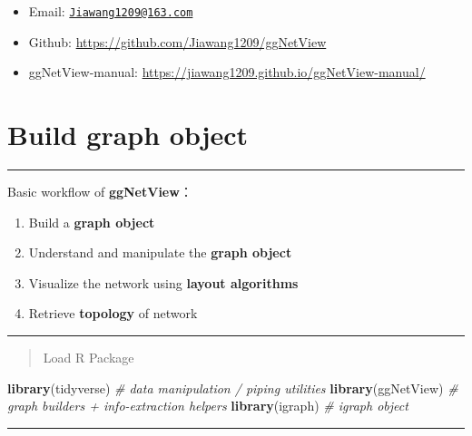 \documentclass[
]{book}
\newenvironment{Shaded}{\begin{snugshade}}{\end{snugshade}}
\newcommand{\CommentTok}[1]{\textcolor[rgb]{0.56,0.35,0.01}{\textit{#1}}}
\newcommand{\FunctionTok}[1]{\textcolor[rgb]{0.13,0.29,0.53}{\textbf{#1}}}
\newcommand{\NormalTok}[1]{#1}
\providecommand{\tightlist}{%
  \setlength{\itemsep}{0pt}\setlength{\parskip}{0pt}}
\begin{document}
\begin{itemize}
\tightlist
\item
  Email: \href{mailto:Jiawang1209@163.com}{\nolinkurl{Jiawang1209@163.com}}
\item
  Github: \url{https://github.com/Jiawang1209/ggNetView}
\item
  ggNetView-manual: \url{https://jiawang1209.github.io/ggNetView-manual/}
\end{itemize}

\chapter{Build graph object}\label{build-graph-object}

\begin{center}\rule{0.5\linewidth}{0.5pt}\end{center}

Basic workflow of \textbf{ggNetView}：

\begin{enumerate}
\def\labelenumi{\arabic{enumi}.}
\tightlist
\item
  Build a \textbf{graph object}
\item
  Understand and manipulate the \textbf{graph object}
\item
  Visualize the network using \textbf{layout algorithms}
\item
  Retrieve \textbf{topology} of network
\end{enumerate}

\begin{center}\rule{0.5\linewidth}{0.5pt}\end{center}

\begin{quote}
Load R Package
\end{quote}

\begin{Shaded}
\begin{Highlighting}[]
\FunctionTok{library}\NormalTok{(tidyverse)   }\CommentTok{\# data manipulation / piping utilities}
\FunctionTok{library}\NormalTok{(ggNetView)   }\CommentTok{\# graph builders + info{-}extraction helpers}
\FunctionTok{library}\NormalTok{(igraph)      }\CommentTok{\# igraph object}
\end{Highlighting}
\end{Shaded}

\begin{center}\rule{0.5\linewidth}{0.5pt}\end{center}
\end{document}
